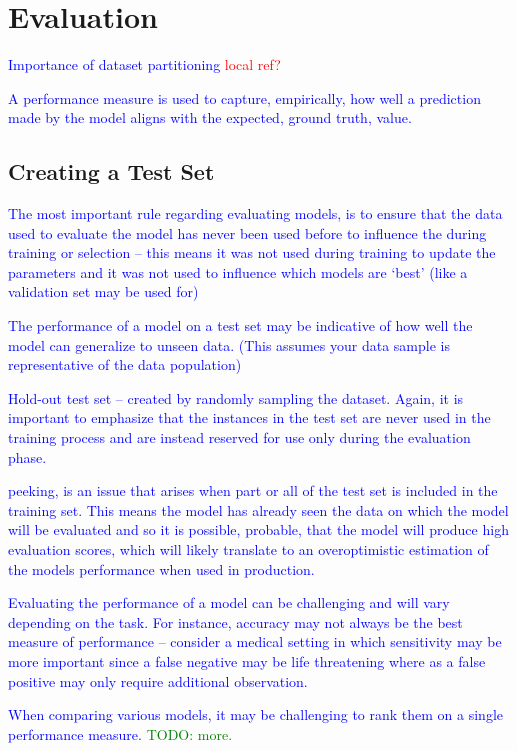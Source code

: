 \section{Evaluation}

\textcolor{blue}{Importance of dataset partitioning \textcolor{red}{local ref?}}


\textcolor{blue}{A performance measure is used to capture, empirically, how well a prediction made by the model aligns with the expected, ground truth, value.}

\subsection{Creating a Test Set}

\textcolor{blue}{The most important rule regarding evaluating models, is to ensure that the data used to evaluate the model has never been used before to influence the during training or selection -- this means it was not used during training to update the parameters and it was not used to influence which models are `best' (like a validation set may be used for)}

\textcolor{blue}{The performance of a model on a test set may be indicative of how well the model can generalize to unseen data. (This assumes your data sample is representative of the data population)}

\textcolor{blue}{Hold-out test set -- created by randomly sampling the dataset. Again, it is important to emphasize that the instances in the test set are never used in the training process and are instead reserved for use only during the evaluation phase.}

\textcolor{blue}{peeking, is an issue that arises when part or all of the test set is included in the training set. This means the model has already seen the data on which the model will be evaluated and so it is possible, probable, that the model will produce high evaluation scores, which will likely translate to an overoptimistic estimation of the models performance when used in production.}

\textcolor{blue}{Evaluating the performance of a model can be challenging and will vary depending on the task. For instance, accuracy may not always be the best measure of performance -- consider a medical setting in which sensitivity may be more important since a false negative may be life threatening where as a false positive may only require additional observation.}

\textcolor{blue}{When comparing various models, it may be challenging to rank them on a single performance measure. \textcolor{green}{TODO: more.}}